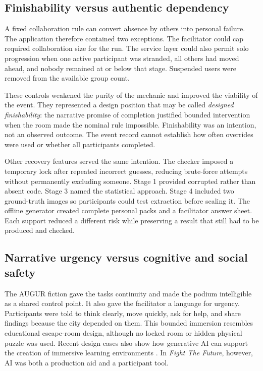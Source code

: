 \documentclass[11pt,a4paper]{article}
\begin{document}
\subsection{Finishability versus authentic dependency}

A fixed collaboration rule can convert absence by others into personal failure. The application therefore contained two exceptions. The facilitator could cap required collaboration size for the run. The service layer could also permit solo progression when one active participant was stranded, all others had moved ahead, and nobody remained at or below that stage. Suspended users were removed from the available group count.

These controls weakened the purity of the mechanic and improved the viability of the event. They represented a design position that may be called \emph{designed finishability}: the narrative promise of completion justified bounded intervention when the room made the nominal rule impossible. Finishability was an intention, not an observed outcome. The event record cannot establish how often overrides were used or whether all participants completed.

Other recovery features served the same intention. The checker imposed a temporary lock after repeated incorrect guesses, reducing brute-force attempts without permanently excluding someone. Stage 1 provided corrupted rather than absent code. Stage 3 named the statistical approach. Stage 4 included two ground-truth images so participants could test extraction before scaling it. The offline generator created complete personal packs and a facilitator answer sheet. Each support reduced a different risk while preserving a result that still had to be produced and checked.

\subsection{Narrative urgency versus cognitive and social safety}

The AUGUR fiction gave the tasks continuity and made the podium intelligible as a shared control point. It also gave the facilitator a language for urgency. Participants were told to think clearly, move quickly, ask for help, and share findings because the city depended on them. This bounded immersion resembles educational escape-room design, although no locked room or hidden physical puzzle was used. Recent design cases also show how generative AI can support the creation of immersive learning environments \citep{na2026escape}. In \emph{Fight The Future}, however, AI was both a production aid and a participant tool.
\end{document}
